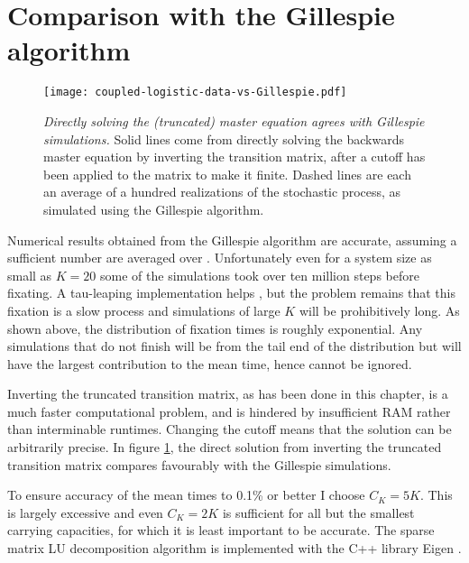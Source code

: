 \section{Comparison with the Gillespie algorithm}%
\begin{figure}[ht]
	\centering
	\texttt{[image: coupled-logistic-data-vs-Gillespie.pdf]}
	\caption{\emph{Directly solving the (truncated) master equation agrees with Gillespie simulations.} Solid lines come from directly solving the backwards master equation by inverting the transition matrix, after a cutoff has been applied to the matrix to make it finite. Dashed lines are each an average of a hundred realizations of the stochastic process, as simulated using the Gillespie algorithm. }
	\label{Gillespie}
\end{figure}

Numerical results obtained from the Gillespie algorithm are accurate, assuming a sufficient number are averaged over \cite{Gillespie1977}. 
Unfortunately even for a system size as small as $K=20$ some of the simulations took over ten million steps before fixating. 
A tau-leaping implementation helps \cite{Cao2006}, but the problem remains that this fixation is a slow process and simulations of large $K$ will be prohibitively long. 
As shown above, the distribution of fixation times is roughly exponential. 
Any simulations that do not finish will be from the tail end of the distribution but will have the largest contribution to the mean time, hence cannot be ignored. 

Inverting the truncated transition matrix, as has been done in this chapter, is a much faster computational problem, and is hindered by insufficient RAM rather than interminable runtimes. 
Changing the cutoff means that the solution can be arbitrarily precise. 
In figure \ref{Gillespie}, the direct solution from inverting the truncated transition matrix compares favourably with the Gillespie simulations. 

To ensure accuracy of the mean times to 0.1\% or better I choose $C_K=5K$. 
This is largely excessive and even $C_K=2K$ is sufficient for all but the smallest carrying capacities, for which it is least important to be accurate. 
The sparse matrix LU decomposition algorithm is implemented with the C++ library Eigen \cite{eigenweb}. 


